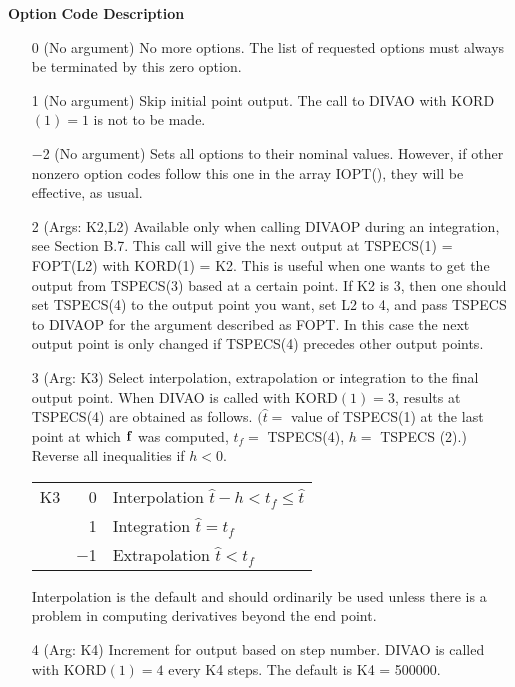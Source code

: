 \documentclass[twoside]{MATH77}
\begin{document}
{\bf Option}\newline
{\bf Code\hspace{1in} Description}\vspace{-8pt}
\begin{itemize}
\item[0]  (No argument) No more options. The list of requested options must
always be terminated by this zero option.

\item[1]  (No argument) Skip initial point output. The call to DIVAO with
KORD$(1)=1$ is not to be made.

\item[$-$2]  (No argument) Sets all options to their nominal values.
However, if other nonzero option codes follow this one in the array IOPT(),
they will be effective, as usual.

\item[2]  (Args: K2,L2) Available only when calling DIVAOP during an
integration, see Section B.7. This call will give the next output at
TSPECS(1) = FOPT(L2) with KORD(1) = K2. This is useful when one wants to
get the output from TSPECS(3) based at a certain point. If K2 is 3,
then one should set TSPECS(4) to the output point you want, set L2 to
4, and pass TSPECS to DIVAOP for the argument described as FOPT. In
this case the next output point is only changed if TSPECS(4) precedes
other output points.

\item[3]  (Arg: K3) Select interpolation, extrapolation or integration to
the final output point. When DIVAO is called with KORD$(1)=3$, results at
TSPECS(4) are obtained as follows. $(\hat t=$ value of TSPECS(1) at the last
point at which ${\bf f}$ was computed, $t_f=$ TSPECS(4), $h =$ TSPECS%
(2).) Reverse all inequalities if $h<0.$
\begin{tabular}{r@{ =}rl}
K3 & 0 & Interpolation $\hat t-h<t_f\leq \hat t$\\

 & 1 & Integration $\hat t = t_f$\\

 & $-$1 & Extrapolation $\hat t<t_f$
\end{tabular}

Interpolation is the default and should ordinarily be used unless
there is a problem in computing derivatives beyond the end point.

\item[4]  (Arg: K4) Increment for output based on step number. DIVAO is
called with KORD$(1)=4$ every K4 steps.  The default is K4 = 500000.


\end{itemize}
\end{document}
